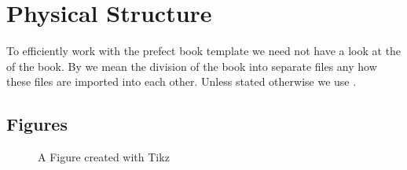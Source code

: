 \documentclass{standalone}
\begin{document}
\chapter{Physical Structure}
To efficiently work with the prefect book template we need not have a look at
the  of the book.
By  we mean the division of the book into separate files any how these
files are imported into each other.
Unless stated otherwise we use .

\section{Figures}
\begin{figure}
	
	\caption{A Figure created with Tikz}
	\label{fig:figure1}
\end{figure}
\end{document}
